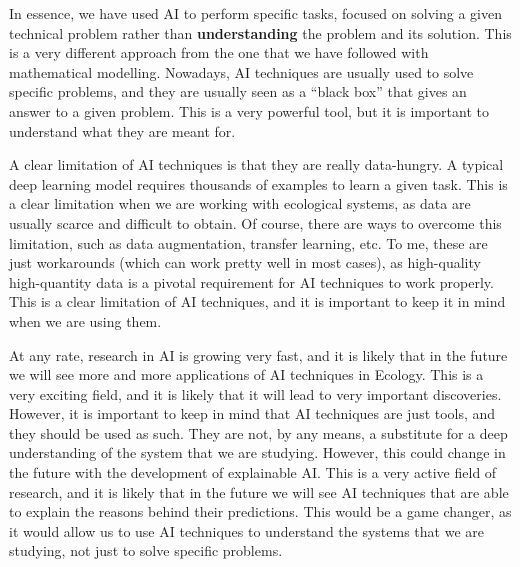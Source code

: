In
essence, we have used AI to perform specific tasks, focused on solving a given
technical problem rather than \textbf{understanding} the problem and its
solution. This is a very different approach from the one that we have followed
with mathematical modelling. Nowadays, AI techniques are usually used to solve
specific problems, and they are usually seen as a ``black box'' that gives an
answer to a given problem. This is a very powerful tool, but it is important to
understand what they are meant for.

A clear limitation of AI techniques is that they are really data-hungry. A
typical deep learning model requires thousands of examples to learn a given
task. This is a clear limitation when we are working with ecological systems,
as data are usually scarce and difficult to obtain. Of course, there are ways
to overcome this limitation, such as data augmentation, transfer learning, etc.
To me, these are just workarounds (which can work pretty well in most cases),
as high-quality high-quantity data is a pivotal requirement for AI techniques
to work properly. This is a clear limitation of AI techniques, and it is
important to keep it in mind when we are using them.

At any rate, research in AI is growing very fast, and it is likely that in the
future we will see more and more applications of AI techniques in Ecology. This
is a very exciting field, and it is likely that it will lead to very important
discoveries. However, it is important to keep in mind that AI techniques are
just tools, and they should be used as such. They are not, by any means, a
substitute for a deep understanding of the system that we are studying.
However, this could change in the future with the development of explainable
AI. This is a very active field of research, and it is likely that in the
future we will see AI techniques that are able to explain the reasons behind
their predictions. This would be a game changer, as it would allow us to use AI
techniques to understand the systems that we are studying, not just to solve
specific problems.

